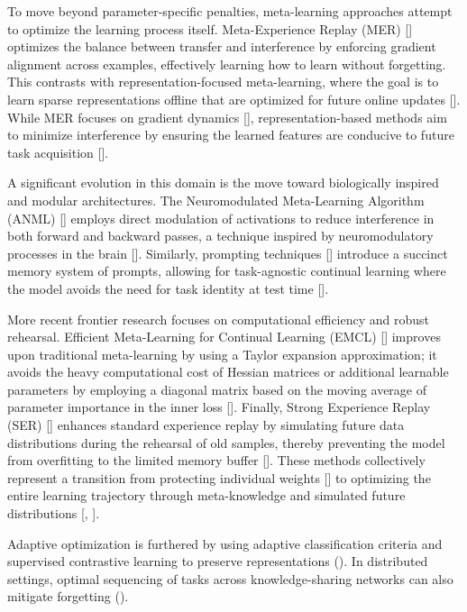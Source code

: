 \documentclass[11pt]{article}
\begin{document}
To move beyond parameter-specific penalties, meta-learning approaches attempt to optimize the learning process itself. Meta-Experience Replay (MER) [\citep{1810.11910}] optimizes the balance between transfer and interference by enforcing gradient alignment across examples, effectively learning how to learn without forgetting. This contrasts with representation-focused meta-learning, where the goal is to learn sparse representations offline that are optimized for future online updates [\citep{1905.12588}]. While MER focuses on gradient dynamics [\citep{1810.11910}], representation-based methods aim to minimize interference by ensuring the learned features are conducive to future task acquisition [\citep{1905.12588}].

A significant evolution in this domain is the move toward biologically inspired and modular architectures. The Neuromodulated Meta-Learning Algorithm (ANML) [\citep{2002.09571}] employs direct modulation of activations to reduce interference in both forward and backward passes, a technique inspired by neuromodulatory processes in the brain [\citep{2002.09571}]. Similarly, prompting techniques [\citep{2112.08654}] introduce a succinct memory system of prompts, allowing for task-agnostic continual learning where the model avoids the need for task identity at test time [\citep{2112.08654}].

More recent frontier research focuses on computational efficiency and robust rehearsal. Efficient Meta-Learning for Continual Learning (EMCL) [\citep{2210.00713}] improves upon traditional meta-learning by using a Taylor expansion approximation; it avoids the heavy computational cost of Hessian matrices or additional learnable parameters by employing a diagonal matrix based on the moving average of parameter importance in the inner loss [\citep{2210.00713}]. Finally, Strong Experience Replay (SER) [\citep{2305.13622}] enhances standard experience replay by simulating future data distributions during the rehearsal of old samples, thereby preventing the model from overfitting to the limited memory buffer [\citep{2305.13622}]. These methods collectively represent a transition from protecting individual weights [\citep{1703.04200}] to optimizing the entire learning trajectory through meta-knowledge and simulated future distributions [\citep{1810.11910}, \citep{2305.13622}].

Adaptive optimization is furthered by using adaptive classification criteria and supervised contrastive learning to preserve representations (\citep{2305.12270}). In distributed settings, optimal sequencing of tasks across knowledge-sharing networks can also mitigate forgetting (\citep{2512.16871}).
\end{document}
